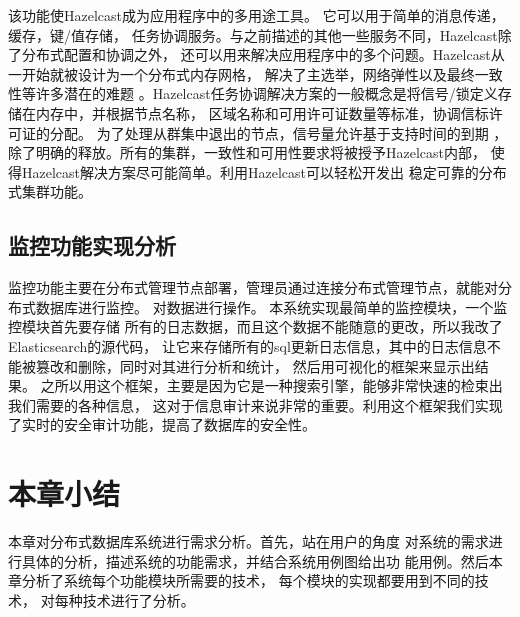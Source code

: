 该功能使Hazelcast成为应用程序中的多用途工具。
它可以用于简单的消息传递，缓存，键/值存储，
任务协调服务。与之前描述的其他一些服务不同，Hazelcast除了分布式配置和协调之外，
还可以用来解决应用程序中的多个问题。Hazelcast从一开始就被设计为一个分布式内存网格，
解决了主选举，网络弹性以及最终一致性等许多潜在的难题
。Hazelcast任务协调解决方案的一般概念是将信号/锁定义存储在内存中，并根据节点名称，
区域名称和可用许可证数量等标准，协调信标许可证的分配。
为了处理从群集中退出的节点，信号量允许基于支持时间的到期
，除了明确的释放。所有的集群，一致性和可用性要求将被授予Hazelcast内部，
使得Hazelcast解决方案尽可能简单。利用Hazelcast可以轻松开发出
稳定可靠的分布式集群功能。
\subsection{监控功能实现分析}
监控功能主要在分布式管理节点部署，管理员通过连接分布式管理节点，就能对分布式数据库进行监控。
对数据进行操作。
本系统实现最简单的监控模块，一个监控模块首先要存储
所有的日志数据，而且这个数据不能随意的更改，所以我改了Elasticsearch的源代码，
让它来存储所有的sql更新日志信息，其中的日志信息不能被篡改和删除，同时对其进行分析和统计，
然后用可视化的框架来显示出结果。
之所以用这个框架，主要是因为它是一种搜索引擎，能够非常快速的检束出我们需要的各种信息，
这对于信息审计来说非常的重要。利用这个框架我们实现了实时的安全审计功能，提高了数据库的安全性。
\section{本章小结}
本章对分布式数据库系统进行需求分析。首先，站在用户的角度
对系统的需求进行具体的分析，描述系统的功能需求，并结合系统用例图给出功
能用例。然后本章分析了系统每个功能模块所需要的技术，
每个模块的实现都要用到不同的技术，
对每种技术进行了分析。
